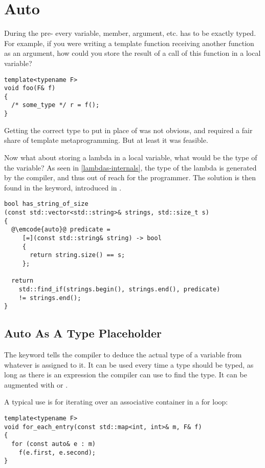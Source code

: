 \section{Auto}

During the pre- every variable, member, argument, etc. has to be
exactly typed. For example, if you were writing a template function
receiving another function as an argument, how could you store the
result of a call of this function in a local variable?

\begin{lstlisting}
template<typename F>
void foo(F& f)
{
  /* some_type */ r = f();
}
\end{lstlisting}

Getting the correct type to put in place of  was not
obvious, and required a fair share of template metaprogramming. But at
least it was feasible.

Now what about storing a lambda in a local variable, what would be the
type of the variable? As seen in \ref{lambdas-internals}, the type of
the lambda is generated by the compiler, and thus out of reach for the
programmer. The solution is then found in the  keyword,
introduced in .

\begin{lstlisting}
bool has_string_of_size
(const std::vector<std::string>& strings, std::size_t s)
{
  @\emcode{auto}@ predicate =
     [=](const std::string& string) -> bool
     {
       return string.size() == s;
     };

  return
    std::find_if(strings.begin(), strings.end(), predicate)
    != strings.end();
}
\end{lstlisting}

\subsection{Auto As A Type Placeholder}

The  keyword tells the compiler to deduce the actual type
of a variable from whatever is assigned to it. It can be used every
time a type should be typed, as long as there is an expression the
compiler can use to find the type. It can be augmented with
 or \code{\&}.

A typical use is for iterating over an associative container in a for
loop:

\begin{lstlisting}
template<typename F>
void for_each_entry(const std::map<int, int>& m, F& f)
{
  for (const auto& e : m)
    f(e.first, e.second);
}
\end{lstlisting}

